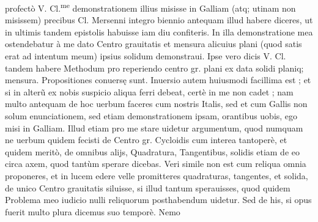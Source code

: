 \documentclass[11pt,a4paper]{article}
\begin{document}
 profectò V. Cl.\textsuperscript{me} demonstrationem illius misisse in Galliam (atq; utinam non misissem) precibus Cl. Mersenni integro biennio antequam illud habere diceres, ut in ultimis tandem epistolis habuisse iam diu confiteris. In illa demonstratione mea ostendebatur à me dato Centro grauitatis et mensura alicuius plani (quod satis erat ad intentum meum) ipsius solidum demonstraui. Ipse vero dicis V. Cl. tandem habere Methodum pro reperiendo centro gr. plani ex data solidi planiq; mensura. Propositiones conuersę sunt. Inuersio autem huiusmodi facillima est ; et si in alterũ ex nobis suspicio aliqua ferri debeat, certè in me non cadet ; nam multo antequam de hoc uerbum faceres cum nostris Italis, sed et cum Gallis non solum enunciationem, sed etiam demonstrationem ipsam, orantibus uobis, ego misi in Galliam. Illud etiam pro me stare uidetur argumentum, quod numquam ne uerbum quidem fecisti de Centro gr. Cycloidis cum interea tantoperè, et quidem meritò,  de omnibus alijs, Quadratura, Tangentibus, solidis etiam de eo circa axem, quod tantùm sperare dicebas. Veri simile non est cum reliqua omnia proponeres, et in lucem edere velle promitteres quadraturas, tangentes, et solida, de unico Centro grauitatis siluisse, si illud tantum sperauisses, quod quidem Problema meo iudicio nulli reliquorum posthabendum uidetur. Sed de his, si opus fuerit multo plura dicemus suo temporè. Nemo

\end{document}
